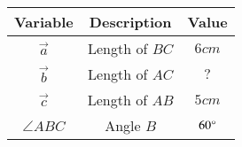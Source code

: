 \begin{center}
    \begin{tabular}{|c|c|c|} 
        \hline
            \textbf{Variable} & \textbf{Description} & \textbf{Value} \\ 
        \hline
            $\vec{a}$    & Length of $BC$ & $6cm$ \\ 
        \hline
            $\vec{b}$    & Length of $AC$ & $?$\\ 
        \hline
            $\vec{c}$    & Length of $AB$ & $5cm$\\
        \hline
            $\angle{ABC}$& Angle $B$      & $60\degree$\\
        \hline
    \end{tabular}
\end{center}